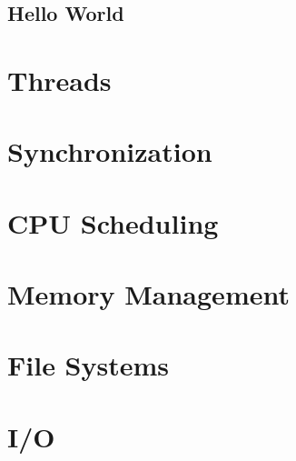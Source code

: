 \documentclass[twoside]{article}
\begin{document}
\subsection{Hello World}
\begin{example}
    
\end{example}

\section{Threads}

\section{Synchronization}

\section{CPU Scheduling}

\section{Memory Management}

\section{File Systems}

\section{I/O}
\end{document}
